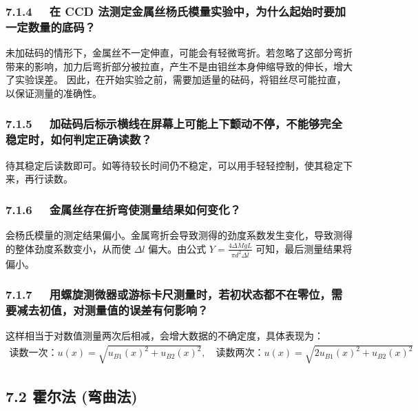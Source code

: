 \documentclass[UTF8]{article}
\theoremstyle{MyLineTheoremStyle} %
\theoremstyle{MyBlockTheoremStyle} %
\theoremstyle{MySubsubsectionStyle} %
\begin{document}
\subsubsection*{7.1.4 \ \ 在 CCD 法测定金属丝杨氏模量实验中，为什么起始时要加一定数量的底码？}
未加砝码的情形下，金属丝不一定伸直，可能会有轻微弯折。若忽略了这部分弯折带来的影响，加力后弯折部分被拉直，产生不是由钼丝本身伸缩导致的伸长，增大了实验误差。
因此，在开始实验之前，需要加适量的砝码，将钼丝尽可能拉直，以保证测量的准确性。

\subsubsection*{7.1.5 \ \ 加砝码后标示横线在屏幕上可能上下颤动不停，不能够完全稳定时，如何判定正确读数？}
待其稳定后读数即可。如等待较长时间仍不稳定，可以用手轻轻控制，使其稳定下来，再行读数。


\subsubsection*{7.1.6 \ \ 金属丝存在折弯使测量结果如何变化？}
会杨氏模量的测定结果偏小。金属弯折会导致测得的劲度系数发生变化，导致测得的整体劲度系数变小，从而使 $\Delta l$ 偏大。由公式 $Y = \frac{4\Delta MgL}{\pi d^{2}\Delta\bar{l}}$ 可知，最后测量结果将偏小。

\subsubsection*{7.1.7 \ \ 用螺旋测微器或游标卡尺测量时，若初状态都不在零位，需要减去初值，对测量值的误差有何影响？}
这样相当于对数值测量两次后相减，会增大数据的不确定度，具体表现为：
\begin{gather}
\text{读数一次：} u(x) = \sqrt{u_{B1}(x)^2 + u_{B2}(x)^2 },\quad 
\text{读数两次：} u(x) = \sqrt{2u_{B1}(x)^2 + u_{B2}(x)^2 }
\end{gather}

\subsection*{7.2 \quad  霍尔法 (弯曲法)}
\end{document}
